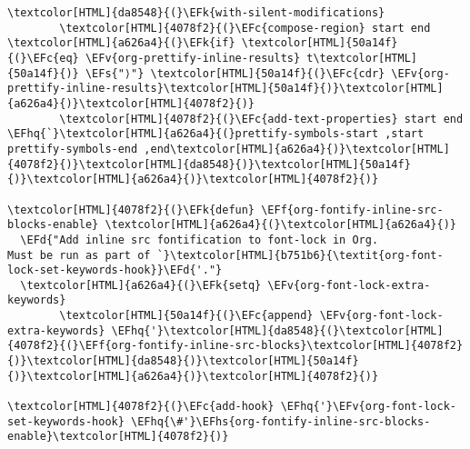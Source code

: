 \documentclass{scrartcl}
\newcommand{\EFk}[1]{\textcolor{EFk}{#1}} %
\newcommand{\EFd}[1]{\textcolor{EFd}{\textit{#1}}} %
\newcommand{\EFs}[1]{\textcolor{EFs}{#1}} %
\newcommand{\EFc}[1]{\textcolor{EFc}{#1}} %
\newcommand{\EFv}[1]{\textcolor{EFv}{#1}} %
\newcommand{\EFf}[1]{\textcolor{EFf}{#1}} %
\newcommand{\EFhq}[1]{\textcolor{EFhq}{#1}} %
\newcommand{\EFhs}[1]{\textcolor{EFhs}{#1}} %
\begin{document}
\begin{enumerate}
\begin{Code}
\begin{Verbatim}[]
      \textcolor[HTML]{da8548}{(}\EFk{with-silent-modifications}
        \textcolor[HTML]{4078f2}{(}\EFc{compose-region} start end \textcolor[HTML]{a626a4}{(}\EFk{if} \textcolor[HTML]{50a14f}{(}\EFc{eq} \EFv{org-prettify-inline-results} t\textcolor[HTML]{50a14f}{)} \EFs{"⟩"} \textcolor[HTML]{50a14f}{(}\EFc{cdr} \EFv{org-prettify-inline-results}\textcolor[HTML]{50a14f}{)}\textcolor[HTML]{a626a4}{)}\textcolor[HTML]{4078f2}{)}
        \textcolor[HTML]{4078f2}{(}\EFc{add-text-properties} start end \EFhq{`}\textcolor[HTML]{a626a4}{(}prettify-symbols-start ,start prettify-symbols-end ,end\textcolor[HTML]{a626a4}{)}\textcolor[HTML]{4078f2}{)}\textcolor[HTML]{da8548}{)}\textcolor[HTML]{50a14f}{)}\textcolor[HTML]{a626a4}{)}\textcolor[HTML]{4078f2}{)}

\textcolor[HTML]{4078f2}{(}\EFk{defun} \EFf{org-fontify-inline-src-blocks-enable} \textcolor[HTML]{a626a4}{(}\textcolor[HTML]{a626a4}{)}
  \EFd{"Add inline src fontification to font-lock in Org.
Must be run as part of `}\textcolor[HTML]{b751b6}{\textit{org-font-lock-set-keywords-hook}}\EFd{'."}
  \textcolor[HTML]{a626a4}{(}\EFk{setq} \EFv{org-font-lock-extra-keywords}
        \textcolor[HTML]{50a14f}{(}\EFc{append} \EFv{org-font-lock-extra-keywords} \EFhq{'}\textcolor[HTML]{da8548}{(}\textcolor[HTML]{4078f2}{(}\EFf{org-fontify-inline-src-blocks}\textcolor[HTML]{4078f2}{)}\textcolor[HTML]{da8548}{)}\textcolor[HTML]{50a14f}{)}\textcolor[HTML]{a626a4}{)}\textcolor[HTML]{4078f2}{)}

\textcolor[HTML]{4078f2}{(}\EFc{add-hook} \EFhq{'}\EFv{org-font-lock-set-keywords-hook} \EFhq{\#'}\EFhs{org-fontify-inline-src-blocks-enable}\textcolor[HTML]{4078f2}{)}
\end{Verbatim}
\end{Code}
\end{enumerate}
\end{document}
